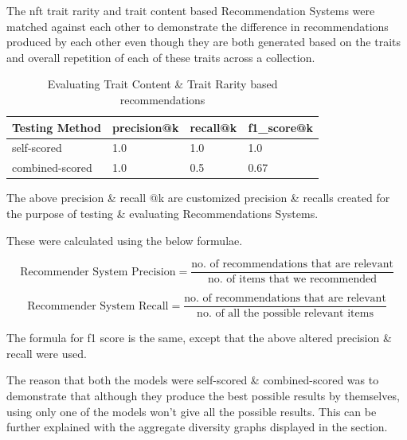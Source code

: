 
The \gls{nft} trait rarity and trait content based Recommendation Systems were matched against each other to demonstrate the difference in recommendations produced by each other even though they are both generated based on the traits and overall repetition of each of these traits across a collection.

\begin{table}[h!]
\centering
\caption{Evaluating Trait Content \& Trait Rarity based recommendations}
\begin{tabular}{|l|l|l|l|}
\hline
\textbf{Testing Method} & \textbf{precision@k} &
\textbf{recall@k} & \textbf{f1\_score@k} \\
\hline
self-scored & 1.0 & 1.0 & 1.0 \\
\hline
combined-scored & 1.0 & 0.5 & 0.67\\
\hline
\end{tabular}
\end{table}

The above precision \& recall @k are customized precision \& recalls created for the purpose of testing \& evaluating Recommendations Systems.

These were calculated using the below formulae.

\[\text{Recommender System Precision} = \frac{\text{no. of recommendations that are relevant}}{\text{no. of items that we recommended}}\]

\[\text{Recommender System Recall} = \frac{\text{no. of recommendations that are relevant}}{\text{no. of all the possible relevant items}}\]

\noindent The formula for f1 score is the same, except that the above altered precision \& recall were used.


The reason that both the models were self-scored \& combined-scored was to demonstrate that although they produce the best possible results by themselves, using only one of the models won't give all the possible results. This can be further explained with the aggregate diversity graphs displayed in the \textbf{} section.

